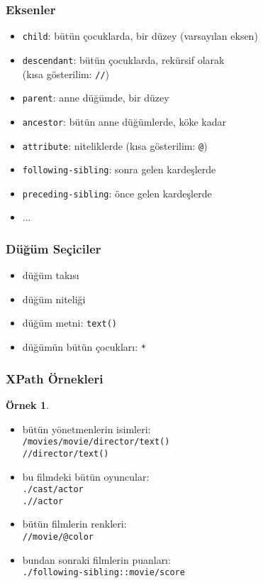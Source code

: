 \documentclass[dvipsnames]{beamer}
\theoremstyle{definition}
\theoremstyle{example}
\newtheorem{ornek}[theorem]{Örnek}
\theoremstyle{plain}
\begin{document}
\begin{frame}
  \frametitle{Eksenler}

  \begin{itemize}
    \item \lstinline!child!:
      bütün çocuklarda, bir düzey (varsayılan eksen)
    \item \lstinline!descendant!:
      bütün çocuklarda, rekürsif olarak\\
      (kısa gösterilim: \lstinline!//!)
    \item \lstinline!parent!:
      anne düğümde, bir düzey
    \item \lstinline!ancestor!:
      bütün anne düğümlerde, köke kadar
    \item \lstinline!attribute!: niteliklerde (kısa gösterilim: \lstinline!@!)
    \item \lstinline!following-sibling!:
      sonra gelen kardeşlerde
    \item \lstinline!preceding-sibling!:
      önce gelen kardeşlerde
    \item ...
  \end{itemize}
\end{frame}

\begin{frame}
  \frametitle{Düğüm Seçiciler}

  \begin{itemize}
    \item düğüm takısı
    \item düğüm niteliği
    \item düğüm metni: \lstinline!text()!
    \item düğümün bütün çocukları: \lstinline!*!
  \end{itemize}
\end{frame}

\begin{frame}
  \frametitle{XPath Örnekleri}

  \begin{ornek}
    \begin{itemize}
      \item bütün yönetmenlerin isimleri:\\
        \lstinline!/movies/movie/director/text()!\\
        \lstinline!//director/text()!

      \pause
      \item bu filmdeki bütün oyuncular:\\
        \lstinline!./cast/actor!\\
        \lstinline!.//actor!

      \pause
      \item bütün filmlerin renkleri:\\
        \lstinline!//movie/@color!

      \pause
      \item bundan sonraki filmlerin puanları:\\
        \lstinline!./following-sibling::movie/score!
    \end{itemize}
  \end{ornek}
\end{frame}
\end{document}
